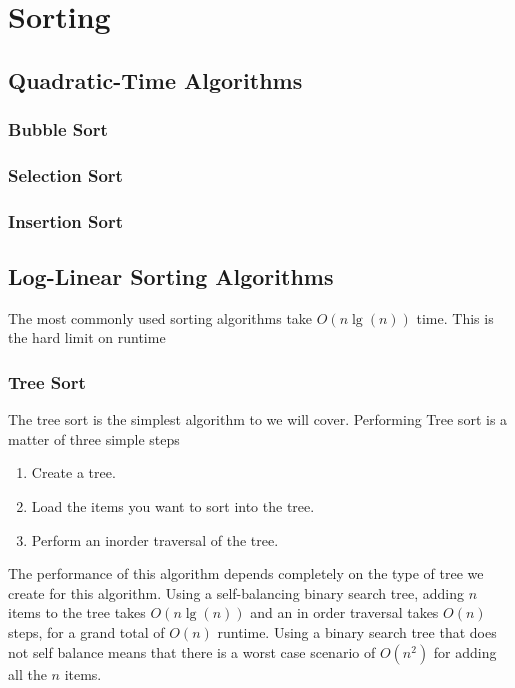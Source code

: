 
\chapter{Sorting}


\section{Quadratic-Time Algorithms}

\subsection{Bubble Sort}

\subsection{Selection Sort}

\subsection{Insertion Sort}


\section{Log-Linear Sorting Algorithms}
The most commonly used sorting algorithms take $ O(n \lg(n)) $ time.
This is the hard limit on runtime %
\subsection{Tree Sort}
The tree sort is the simplest algorithm to we will cover. Performing Tree sort is a matter of three simple steps

\begin{enumerate}
	\item Create a tree.
	\item Load the items you want to sort into the tree.
	\item Perform an inorder traversal of the tree.
\end{enumerate}


The performance of this algorithm depends completely on the type of tree we create for this algorithm.  Using a self-balancing binary search tree, adding $ n $ items to the tree takes $ O(n\lg(n)) $ and an in order traversal takes $ O(n) $ steps, for a grand total of $ O(n) $ runtime.  Using a binary search tree that does not self balance means that there is a worst case scenario of $ O(n^{2}) $ for adding all the $ n $ items.

